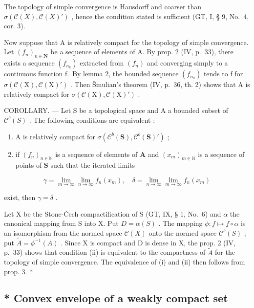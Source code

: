 The topology of simple convergence is Hausdorff and coarser than \(\sigma(\mathcal{C}(X), \mathcal{C}(X)')\) , hence the condition stated is sufficient (GT, I, § 9, No.~4, cor. 3).

Now suppose that A is relatively compact for the topology of simple convergence. Let \((f_{n})_{n\in\mathbf{N}}\) be a sequence of elements of A. By prop. 2 (IV, p.~33), there exists a sequence \((f_{n_{k}})\) extracted from \((f_{n})\) and converging simply to a continuous function f.~By lemma 2, the bounded sequence \((f_{n_{k}})\) tends to f for \(\sigma(\mathcal{C}(\mathrm{X}),\mathcal{C}(\mathrm{X})')\) . Then Šmulian's theorem (IV, p.~36, th. 2) shows that A is relatively compact for \(\sigma(\mathcal{C}(\mathrm{X}),\mathcal{C}(\mathrm{X})')\) .

COROLLARY. --- Let S be a topological space and A a bounded subset of \(\mathcal{C}^{b}(S)\) . The following conditions are equivalent :

\begin{enumerate}
\def\labelenumi{(\roman{enumi})}
\item
  A is relatively compact for \(\sigma(\mathcal{C}^b(\mathbf{S}),\mathcal{C}^b(\mathbf{S})')\) ;
\item
  if \((f_n)_{n\in \mathbb{N}}\) is a sequence of elements of \(\mathbf{A}\) and \((x_m)_{m\in \mathbb{N}}\) is a sequence of points of \(\mathbf{S}\) such that the iterated limits
\end{enumerate}

\[
\gamma = \lim _ {m \rightarrow \infty} \lim _ {n \rightarrow \infty} f _ {n} (x _ {m}), \quad \delta = \lim _ {n \rightarrow \infty} \lim _ {m \rightarrow \infty} f _ {n} (x _ {m})
\]

exist, then \(\gamma = \delta\) .

Let X be the Stone-Čech compactification of S (GT, IX, § 1, No.~6) and \(\alpha\) the canonical mapping from S into X. Put \(D = \alpha(S)\) . The mapping \(\phi: f \mapsto f \circ \alpha\) is an isomorphism from the normed space \(\mathcal{C}(X)\) onto the normed space \(\mathcal{C}^b(S)\) ; put \(\tilde{A} = \phi^{-1}(A)\) . Since X is compact and D is dense in X, the prop. 2 (IV, p.~33) shows that condition (ii) is equivalent to the compactness of \(\tilde{A}\) for the topology of simple convergence. The equivalence of (i) and (ii) then follows from prop. 3. *

\subsection{* Convex envelope of a weakly compact set}

